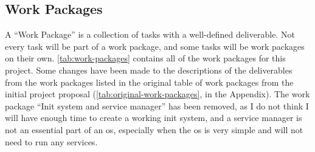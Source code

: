 \documentclass{article}
\begin{document}
\subsection{Work Packages}
\label{sec:work_packages}
A ``Work Package'' is a collection of tasks with a well-defined deliverable.
Not every task will be part of a work package, and some tasks will be work
packages on their own. \autoref{tab:work-packages} contains all of the work
packages for this project. Some changes have been made to the descriptions of
the deliverables from the work packages listed in the original table of work
packages from the initial project proposal
(\autoref{tab:original-work-packages}, in the Appendix). The work package
``Init system and service manager'' has been removed, as I do not think I will
have enough time to create a working init system, and a service manager is not
an essential part of an \gls{os}, especially when the \gls{os} is very simple
and will not need to run any services.
\end{document}
